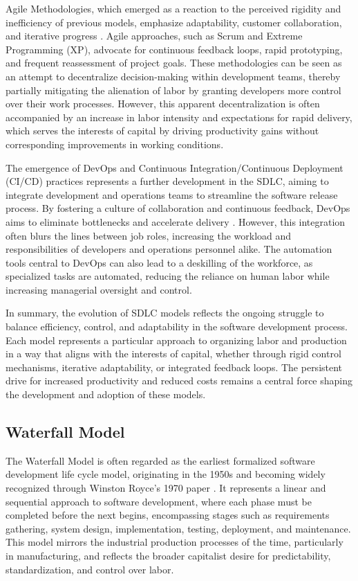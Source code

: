 \begin{refsection}
Agile Methodologies, which emerged as a reaction to the perceived rigidity and inefficiency of previous models, emphasize adaptability, customer collaboration, and iterative progress \cite[pp.~48-50]{Beck2021}. Agile approaches, such as Scrum and Extreme Programming (XP), advocate for continuous feedback loops, rapid prototyping, and frequent reassessment of project goals. These methodologies can be seen as an attempt to decentralize decision-making within development teams, thereby partially mitigating the alienation of labor by granting developers more control over their work processes. However, this apparent decentralization is often accompanied by an increase in labor intensity and expectations for rapid delivery, which serves the interests of capital by driving productivity gains without corresponding improvements in working conditions.

The emergence of DevOps and Continuous Integration/Continuous Deployment (CI/CD) practices represents a further development in the SDLC, aiming to integrate development and operations teams to streamline the software release process. By fostering a culture of collaboration and continuous feedback, DevOps aims to eliminate bottlenecks and accelerate delivery \cite[pp.~23-27]{Kim2024}. However, this integration often blurs the lines between job roles, increasing the workload and responsibilities of developers and operations personnel alike. The automation tools central to DevOps can also lead to a deskilling of the workforce, as specialized tasks are automated, reducing the reliance on human labor while increasing managerial oversight and control.

In summary, the evolution of SDLC models reflects the ongoing struggle to balance efficiency, control, and adaptability in the software development process. Each model represents a particular approach to organizing labor and production in a way that aligns with the interests of capital, whether through rigid control mechanisms, iterative adaptability, or integrated feedback loops. The persistent drive for increased productivity and reduced costs remains a central force shaping the development and adoption of these models.

\subsection{Waterfall Model}

The Waterfall Model is often regarded as the earliest formalized software development life cycle model, originating in the 1950s and becoming widely recognized through Winston Royce's 1970 paper \cite[pp.~12-15]{Royce1970}. It represents a linear and sequential approach to software development, where each phase must be completed before the next begins, encompassing stages such as requirements gathering, system design, implementation, testing, deployment, and maintenance. This model mirrors the industrial production processes of the time, particularly in manufacturing, and reflects the broader capitalist desire for predictability, standardization, and control over labor.


\end{refsection}
